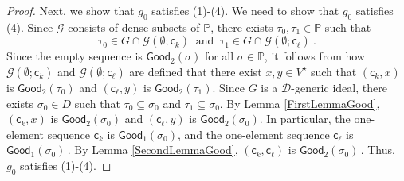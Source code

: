 \documentclass[10pt,a4paper, openany,  oldfontcommands]{memoir}
\newtheorem{open problem} [theorem] {Open Problem}
\begin{document}
\begin{proof}
Next, we show that  $g_0 $  satisfies  (1)-(4). 
We need to show that   $g_0 $  satisfies  (4). 
Since  $  \mathcal{G} $  consists of dense subsets of   $  \mathbb{P} $,   there exists  $  \tau_0,  \tau_1  \in  \mathbb{P} $  such that  
\[
\tau_0  \in G  \cap  \mathcal{G} \left(  \emptyset ;  \mathsf{c}_k    \right)  
\      \mbox{  and   }   \   
\tau_1  \in G  \cap  \mathcal{G} \left(  \emptyset ;  \mathsf{c}_{  \ell  }    \right)  
\          .
\]
Since  the empty sequence is   $  \mathsf{Good}_2  \left(  \sigma \right)  $   for  all $  \sigma  \in  \mathbb{P}  $, 
it follows from how   $   \mathcal{G} \left(  \emptyset ;  \mathsf{c}_k    \right)   $  
and   $   \mathcal{G} \left(  \emptyset ;  \mathsf{c}_{  \ell  }     \right)   $  are defined that 
there exist  $   x, y  \in  V^{  \star }   $  such that  
$  \left(   \mathsf{c}_k   ,   x  \right)  $  is    $  \mathsf{Good}_2  \left(  \tau_0  \right)  $
and 
$  \left(   \mathsf{c}_{  \ell }   ,   y  \right)  $  is    $  \mathsf{Good}_2  \left(  \tau_1  \right)  $. 
Since  $G$ is a  $  \mathcal{D} $-generic ideal,  
there exists $  \sigma_0  \in  D  $  such that  $  \tau_0  \subseteq   \sigma_0  $  and  $  \tau_1  \subseteq   \sigma_0  $. 
By Lemma \ref{FirstLemmaGood},  
$  \left(   \mathsf{c}_k   ,   x  \right)  $  is    $  \mathsf{Good}_2  \left(  \sigma_0  \right)  $
and 
$  \left(   \mathsf{c}_{  \ell }   ,   y  \right)  $  is    $  \mathsf{Good}_2  \left(  \sigma_0  \right)  $. 
In particular, 
the one-element sequence    $    \mathsf{c}_k  $  is   $  \mathsf{Good}_1  \left(  \sigma_0  \right)  $,  
and  the one-element sequence    $    \mathsf{c}_{  \ell }  $  is   $  \mathsf{Good}_1  \left(  \sigma_0  \right)     \,    $. 
By Lemma  \ref{SecondLemmaGood}, 
$  \left(   \mathsf{c}_{  k }   ,    \mathsf{c}_{  \ell }   \right)  $  is    $  \mathsf{Good}_2  \left(  \sigma_0  \right)        \,   $. 
Thus,  $g_0$  satisfies (1)-(4). 












\end{proof}
\end{document}
